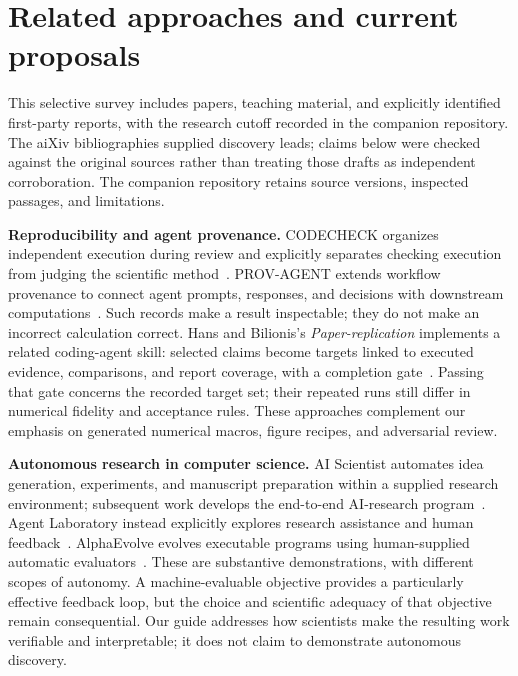 \documentclass[aps,prd,reprint,nofootinbib]{revtex4-2}
\begin{document}
\section{Related approaches and current proposals}\label{app:related}
This selective survey includes papers, teaching material, and explicitly identified first-party reports, with the research cutoff recorded in the companion repository. The aiXiv bibliographies supplied discovery leads; claims below were checked against the original sources rather than treating those drafts as independent corroboration. The companion repository retains source versions, inspected passages, and limitations.

\textbf{Reproducibility and agent provenance.} CODECHECK organizes independent execution during review and explicitly separates checking execution from judging the scientific method~\cite{CODECHECK}. PROV-AGENT extends workflow provenance to connect agent prompts, responses, and decisions with downstream computations~\cite{PROVAGENT}. Such records make a result inspectable; they do not make an incorrect calculation correct. Hans and Bilionis's \emph{Paper-replication} implements a related coding-agent skill: selected claims become targets linked to executed evidence, comparisons, and report coverage, with a completion gate~\cite{PaperReplication}. Passing that gate concerns the recorded target set; their repeated runs still differ in numerical fidelity and acceptance rules. These approaches complement our emphasis on generated numerical macros, figure recipes, and adversarial review.

\textbf{Autonomous research in computer science.} AI Scientist automates idea generation, experiments, and manuscript preparation within a supplied research environment; subsequent work develops the end-to-end AI-research program~\cite{AIScientist,AIResearch2026}. Agent Laboratory instead explicitly explores research assistance and human feedback~\cite{AgentLab}. AlphaEvolve evolves executable programs using human-supplied automatic evaluators~\cite{AlphaEvolve}. These are substantive demonstrations, with different scopes of autonomy. A machine-evaluable objective provides a particularly effective feedback loop, but the choice and scientific adequacy of that objective remain consequential. Our guide addresses how scientists make the resulting work verifiable and interpretable; it does not claim to demonstrate autonomous discovery.
\end{document}
